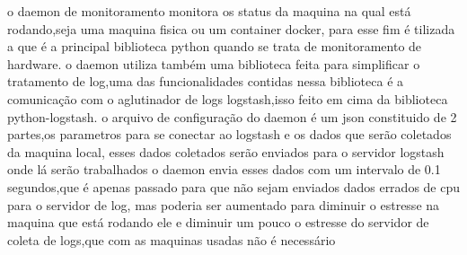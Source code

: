 \documentclass[
	12pt,				%
	openright,			%
	oneside,			%
	a4paper,			%
	english,			%
	french,				%
	spanish,			%
	brazil,				%
	]{abntex2}
\begin{document}
o daemon de monitoramento monitora os status da maquina na qual está rodando,seja uma maquina fisica ou um container docker,
para esse fim é tilizada a  que é a principal biblioteca python quando se trata de monitoramento de hardware.
o daemon utiliza também uma biblioteca feita para simplificar o tratamento de log,uma das funcionalidades contidas nessa biblioteca é a comunicação com o aglutinador de logs logstash,isso feito em cima da biblioteca python-logstash.
o arquivo de configuração do daemon é um json constituido de 2 partes,os parametros para se conectar ao logstash e os dados que serão coletados da maquina local,
esses dados coletados serão enviados para o servidor logstash onde lá serão trabalhados
o daemon envia esses dados com um intervalo de 0.1 segundos,que é apenas passado para que não sejam enviados dados errados de cpu para o servidor de log,
mas poderia ser aumentado para diminuir o estresse na maquina que está rodando ele e diminuir um pouco o estresse do servidor de coleta de logs,que com as maquinas usadas não é necessário
\end{document}
